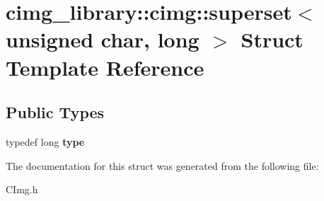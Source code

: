 \hypertarget{structcimg__library_1_1cimg_1_1superset_3_01unsigned_01char_00_01long_01_4}{\section{cimg\-\_\-library\-:\-:cimg\-:\-:superset$<$ unsigned char, long $>$ Struct Template Reference}
\label{structcimg__library_1_1cimg_1_1superset_3_01unsigned_01char_00_01long_01_4}
}
\subsection*{Public Types}
\begin{DoxyCompactItemize}
\item 
\hypertarget{structcimg__library_1_1cimg_1_1superset_3_01unsigned_01char_00_01long_01_4_a4596ef4cd3b3bd56f673b330f14d449f}{typedef long {\bfseries type}}\label{structcimg__library_1_1cimg_1_1superset_3_01unsigned_01char_00_01long_01_4_a4596ef4cd3b3bd56f673b330f14d449f}

\end{DoxyCompactItemize}


The documentation for this struct was generated from the following file\-:\begin{DoxyCompactItemize}
\item 
C\-Img.\-h\end{DoxyCompactItemize}
